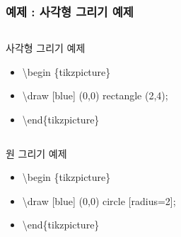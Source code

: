 \documentclass[ aspectratio=169,  12pt,blue,xcolor=pdftex,dvipsnames,table,handout,notes]{beamer}
\begin{document}
		\begin{frame}[t]
		\frametitle{예제 : 사각형 그리기 예제}

			\begin{columns}[t]
			\begin{column}{.6\textwidth}
			\begin{block} {사각형 그리기 예제}
			\begin{itemize}
				\item[] \textbackslash begin \{tikzpicture\}
				\item[] \textbackslash draw [blue] (0,0) rectangle (2,4);
				\item[] \textbackslash end\{tikzpicture\}
			\end{itemize}
			\end{block}
			\end{column}


			\begin{column}{.4\textwidth}
			\begin{example}
			\end{example}
			\end{column}
			\end{columns}


			\begin{columns}[t]
			\begin{column}{.6\textwidth}
			\begin{block} {원 그리기 예제}
			\begin{itemize}
				\item[] \textbackslash begin \{tikzpicture\}
				\item[] \textbackslash draw [blue] (0,0) circle [radius=2];
				\item[] \textbackslash end\{tikzpicture\}
			\end{itemize}
			\end{block}
			\end{column}


			\begin{column}{.4\textwidth}
			\begin{example}
			\end{example}
			\end{column}


\end{columns}
\end{frame}
\end{document}

